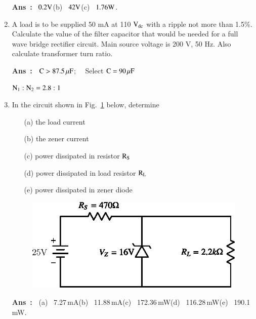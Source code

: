 \begin{enumerate}
\noindent
{\bf Ans~:}~ $0.2\textrm{V}$\quad (b)~ $42\textrm{V}$\quad (c)~ $1.76\textrm{W}$.

\item A load is to be supplied 50 mA at 110 $\textrm{V}_{\text{dc}}$ with a ripple not more than 1.5\%. Calculate the value of the filter capacitor that would be needed for a full wave bridge rectifier circuit. Main source voltage is 200 V, 50 Hz. Also calculate transformer turn ratio.

\smallskip
\noindent
{\bf Ans~:~} $\textrm{C}>87.5\,\mu\textrm{F}$; \ \ Select $\textrm{C}=90\,\mu\textrm{F}$

$\textrm{N}_{1}:\textrm{N}_{2}=2.8:1$

\item In the circuit shown in Fig.~\ref{fig1.56} below, determine
\begin{itemize}
\item[(a)] the load current

\item[(b)] the zener current

\item[(c)] power dissipated in resistor $\textrm{R}_{\textrm{S}}$

\item[(d)] power dissipated in load resistor $\textrm{R}_{\textrm{L}}$

\item[(e)] power dissipated in zener diode
\end{itemize}
\begin{figure}[H]
\centering
\includegraphics{chap1/fig1.56.eps}
\caption{}\label{fig1.56}
\end{figure}

\noindent
{\bf Ans~:~} (a)~ 7.27\,mA\quad (b)~ 11.88\,mA\quad (c)~ 172.36\,mW\quad (d)~ 116.28\,mW\quad (e)~ 190.1\,mW.
\end{enumerate}

\label{1end}
